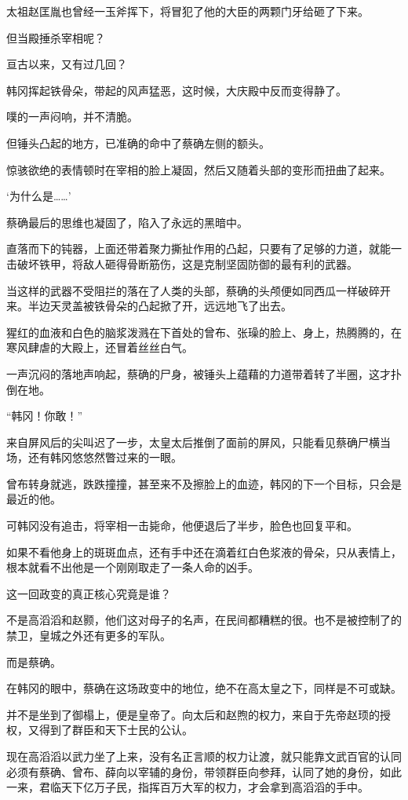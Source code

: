 太祖赵匡胤也曾经一玉斧挥下，将冒犯了他的大臣的两颗门牙给砸了下来。

但当殿捶杀宰相呢？

亘古以来，又有过几回？

韩冈挥起铁骨朵，带起的风声猛恶，这时候，大庆殿中反而变得静了。

噗的一声闷响，并不清脆。

但锤头凸起的地方，已准确的命中了蔡确左侧的额头。

惊骇欲绝的表情顿时在宰相的脸上凝固，然后又随着头部的变形而扭曲了起来。

‘为什么是……’

蔡确最后的思维也凝固了，陷入了永远的黑暗中。

直落而下的钝器，上面还带着聚力撕扯作用的凸起，只要有了足够的力道，就能一击破坏铁甲，将敌人砸得骨断筋伤，这是克制坚固防御的最有利的武器。

当这样的武器不受阻拦的落在了人类的头部，蔡确的头颅便如同西瓜一样破碎开来。半边天灵盖被铁骨朵的凸起掀了开，远远地飞了出去。

猩红的血液和白色的脑浆泼溅在下首处的曾布、张璪的脸上、身上，热腾腾的，在寒风肆虐的大殿上，还冒着丝丝白气。

一声沉闷的落地声响起，蔡确的尸身，被锤头上蕴藉的力道带着转了半圈，这才扑倒在地。

“韩冈！你敢！”

来自屏风后的尖叫迟了一步，太皇太后推倒了面前的屏风，只能看见蔡确尸横当场，还有韩冈悠悠然瞥过来的一眼。

曾布转身就逃，跌跌撞撞，甚至来不及擦脸上的血迹，韩冈的下一个目标，只会是最近的他。

可韩冈没有追击，将宰相一击毙命，他便退后了半步，脸色也回复平和。

如果不看他身上的斑斑血点，还有手中还在滴着红白色浆液的骨朵，只从表情上，根本就看不出他是一个刚刚取走了一条人命的凶手。

这一回政变的真正核心究竟是谁？

不是高滔滔和赵颢，他们这对母子的名声，在民间都糟糕的很。也不是被控制了的禁卫，皇城之外还有更多的军队。

而是蔡确。

在韩冈的眼中，蔡确在这场政变中的地位，绝不在高太皇之下，同样是不可或缺。

并不是坐到了御榻上，便是皇帝了。向太后和赵煦的权力，来自于先帝赵顼的授权，又得到了群臣和天下士民的公认。

现在高滔滔以武力坐了上来，没有名正言顺的权力让渡，就只能靠文武百官的认同必须有蔡确、曾布、薛向以宰辅的身份，带领群臣向参拜，认同了她的身份，如此一来，君临天下亿万子民，指挥百万大军的权力，才会拿到高滔滔的手中。


